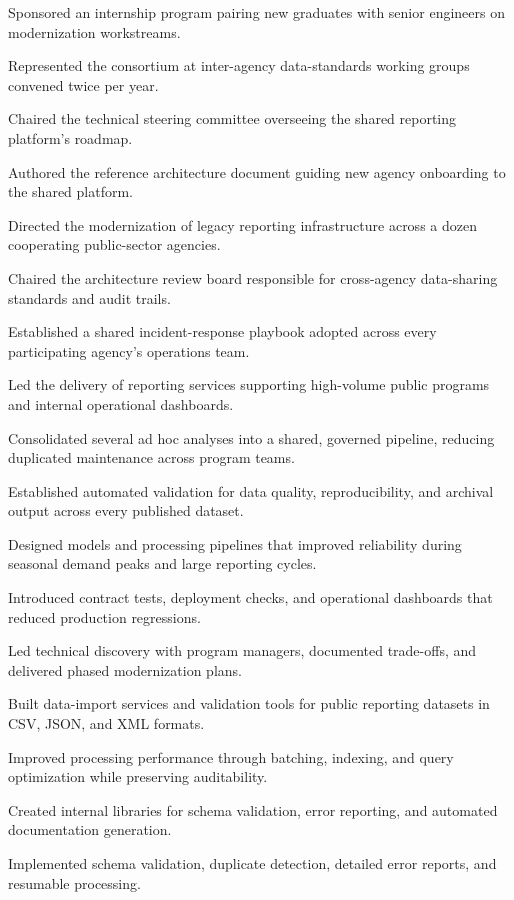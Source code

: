 \documentclass[fontsize=11pt, margin=narrow, medium=print]{careerdossier-resume}
\begin{document}
\begin{CDossierEntry}[title = {Modernization Program}, organization = {Continental Reliability Consortium}, location = {Ottawa, ON}, dates = {2010--Present}]
\begin{CDossierItemize}
    \item Sponsored an internship program pairing new graduates with senior engineers on modernization workstreams.
    \item Represented the consortium at inter-agency data-standards working groups convened twice per year.
    \item Chaired the technical steering committee overseeing the shared reporting platform's roadmap.
    \item Authored the reference architecture document guiding new agency onboarding to the shared platform.
    \item Directed the modernization of legacy reporting infrastructure across a dozen cooperating public-sector agencies.
    \item Chaired the architecture review board responsible for cross-agency data-sharing standards and audit trails.
    \item Established a shared incident-response playbook adopted across every participating agency's operations team.
    \item Led the delivery of reporting services supporting high-volume public programs and internal operational dashboards.
    \item Consolidated several ad hoc analyses into a shared, governed pipeline, reducing duplicated maintenance across program teams.
    \item Established automated validation for data quality, reproducibility, and archival output across every published dataset.
    \item Designed models and processing pipelines that improved reliability during seasonal demand peaks and large reporting cycles.
    \item Introduced contract tests, deployment checks, and operational dashboards that reduced production regressions.
    \item Led technical discovery with program managers, documented trade-offs, and delivered phased modernization plans.
    \item Built data-import services and validation tools for public reporting datasets in CSV, JSON, and XML formats.
    \item Improved processing performance through batching, indexing, and query optimization while preserving auditability.
    \item Created internal libraries for schema validation, error reporting, and automated documentation generation.
    \item Implemented schema validation, duplicate detection, detailed error reports, and resumable processing.

\end{CDossierItemize}
\end{CDossierEntry}
\end{document}
